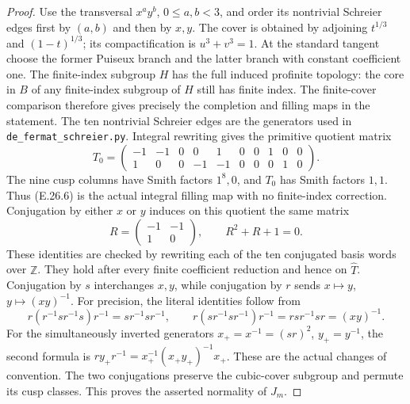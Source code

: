 \begin{proof}
Use the transversal $x^a y^b$, $0\le a,b<3$, and order its
nontrivial Schreier edges first by $(a,b)$ and then by $x,y$.
The cover is obtained by adjoining $t^{1/3}$ and
$(1-t)^{1/3}$; its compactification is $u^3+v^3=1$.
At the standard tangent choose the former Puiseux branch and
the latter branch with constant coefficient one.
The finite-index subgroup $H$ has the full induced profinite
topology: the core in $B$ of any finite-index subgroup of $H$
still has finite index.  The finite-cover comparison therefore
gives precisely the completion and filling maps in the statement.
The ten nontrivial Schreier edges are the generators used in
\texttt{de\_fermat\_schreier.py}.  Integral rewriting gives
the primitive quotient matrix
\[
 T_0=\begin{pmatrix}
 -1&-1&0&0&1&0&0&1&0&0\\
  1&0&0&-1&-1&0&0&0&1&0
 \end{pmatrix}.
 \tag{E.26.6}
\]
The nine cusp columns have Smith factors $1^8,0$, and $T_0$
has Smith factors $1,1$.  Thus (E.26.6) is the actual integral
filling map with no finite-index correction.  Conjugation by
either $x$ or $y$ induces on this quotient the same matrix
\[
          R=\begin{pmatrix}-1&-1\\1&0\end{pmatrix},
           \qquad R^2+R+1=0.
 \tag{E.26.7}
\]
These identities are checked by rewriting each of the ten
conjugated basis words over $\mathbb Z$.  They hold after
every finite coefficient reduction and hence on $\widehat T$.
Conjugation by $s$ interchanges $x,y$, while conjugation by
$r$ sends $x\mapsto y$, $y\mapsto(xy)^{-1}$.
For precision, the literal identities follow from
\[
 r(r^{-1}sr^{-1}s)r^{-1}=sr^{-1}sr^{-1},\qquad
 r(sr^{-1}sr^{-1})r^{-1}=rsr^{-1}sr=(xy)^{-1}.
\]
For the simultaneously inverted generators
$x_+=x^{-1}=(sr)^2$, $y_+=y^{-1}$, the second formula is
$ry_+r^{-1}=x_+^{-1}(x_+y_+)^{-1}x_+$.
These are the actual changes of convention.
The two conjugations preserve the cubic-cover subgroup and permute its cusp
classes.  This proves the asserted normality of $J_m$.


\end{proof}
